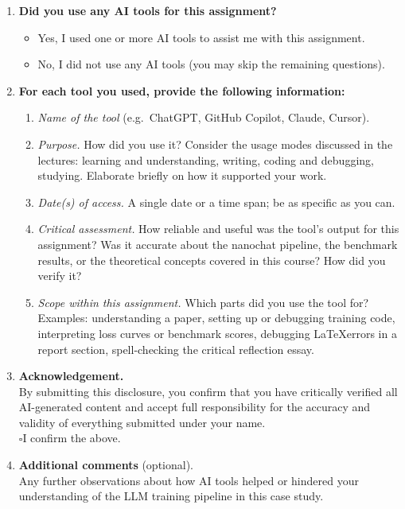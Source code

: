 \begin{enumerate}
    \item \textbf{Did you use any AI tools for this assignment?}
    \begin{itemize}[label=$\square$, leftmargin=2em]
        \item Yes, I used one or more AI tools to assist me with this assignment.
        \item No, I did not use any AI tools (you may skip the remaining questions).
    \end{itemize}

    \item \textbf{For each tool you used, provide the following information:}
    \begin{enumerate}[label=\alph*.]
        \item \textit{Name of the tool} (e.g.\ ChatGPT, GitHub Copilot, Claude, Cursor).
        \item \textit{Purpose.}  How did you use it?  Consider the usage modes discussed in the lectures: learning and understanding, writing, coding and debugging, studying. Elaborate briefly on how it supported your work.
        \item \textit{Date(s) of access.}  A single date or a time span; be as specific as you can.
        \item \textit{Critical assessment.}  How reliable and useful was the tool's output for this assignment?  Was it accurate about the nanochat pipeline, the benchmark results, or the theoretical concepts covered in this course?  How did you verify it?
        \item \textit{Scope within this assignment.}  Which parts did you use the tool for? Examples: understanding a paper, setting up or debugging training code, interpreting loss curves or benchmark scores, debugging \LaTeX errors in a report section, spell-checking the critical reflection essay.
    \end{enumerate}

    \item \textbf{Acknowledgement.}\\
    By submitting this disclosure, you confirm that you have critically verified all AI-generated content and accept full responsibility for the accuracy and validity of everything submitted under your name.\\[4pt]
    $\square$\quad I confirm the above.

    \item \textbf{Additional comments} (optional).\\
    Any further observations about how AI tools helped or hindered your understanding of the LLM training pipeline in this case study.

\end{enumerate}


